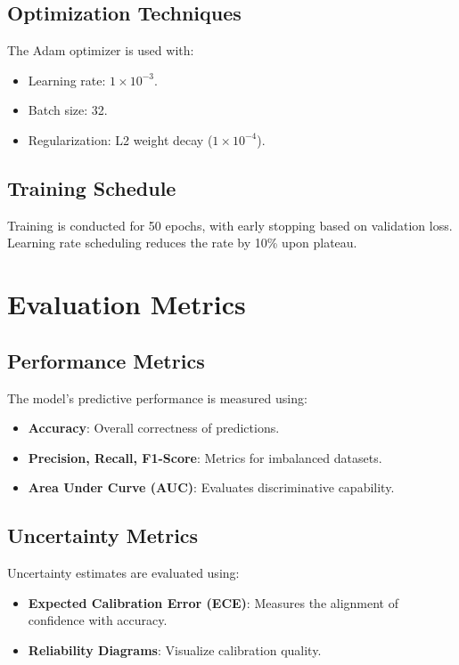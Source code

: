 \documentclass[12pt,twocolumn]{report}
\begin{document}
\subsection{Optimization Techniques}
The Adam optimizer is used with:
\begin{itemize}
    \item Learning rate: $1 \times 10^{-3}$.
    \item Batch size: 32.
    \item Regularization: L2 weight decay ($1 \times 10^{-4}$).
\end{itemize}

\subsection{Training Schedule}
Training is conducted for 50 epochs, with early stopping based on validation loss. Learning rate scheduling reduces the rate by 10\% upon plateau.

\section{Evaluation Metrics}

\subsection{Performance Metrics}
The model’s predictive performance is measured using:
\begin{itemize}
    \item \textbf{Accuracy}: Overall correctness of predictions.
    \item \textbf{Precision, Recall, F1-Score}: Metrics for imbalanced datasets.
    \item \textbf{Area Under Curve (AUC)}: Evaluates discriminative capability.
\end{itemize}

\subsection{Uncertainty Metrics}
Uncertainty estimates are evaluated using:
\begin{itemize}
    \item \textbf{Expected Calibration Error (ECE)}: Measures the alignment of confidence with accuracy.
    \item \textbf{Reliability Diagrams}: Visualize calibration quality.
\end{itemize}
\end{document}
